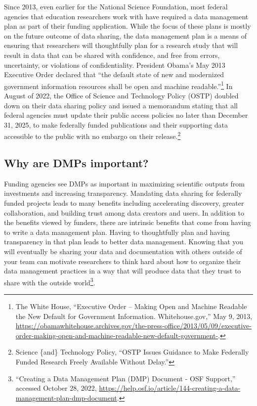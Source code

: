 \documentclass[
]{book}
\begin{document}
Since 2013, even earlier for the National Science Foundation, most federal agencies that education researchers work with have required a data management plan as part of their funding application. While the focus of these plans is mostly on the future outcome of data sharing, the data management plan is a means of ensuring that researchers will thoughtfully plan for a research study that will result in data that can be shared with confidence, and free from errors, uncertainty, or violations of confidentiality. President Obama's May 2013 Executive Order declared that ``the default state of new and modernized government information resources shall be open and machine readable.''\footnote{The White House, {``Executive Order -- Making Open and Machine Readable the New Default for Government Information. Whitehouse.gov,''} May 9, 2013, \url{https://obamawhitehouse.archives.gov/the-press-office/2013/05/09/executive-order-making-open-and-machine-readable-new-default-government-}.} In August of 2022, the Office of Science and Technology Policy (OSTP) doubled down on their data sharing policy and issued a memorandum stating that all federal agencies must update their public access policies no later than December 31, 2025, to make federally funded publications and their supporting data accessible to the public with no embargo on their release.\footnote{Science \{and\} Technology Policy, {``{OSTP} Issues Guidance to Make Federally Funded Research Freely Available Without Delay.''}}

\hypertarget{why-are-dmps-important}{%
\subsection{Why are DMPs important?}\label{why-are-dmps-important}}

Funding agencies see DMPs as important in maximizing scientific outputs from investments and increasing transparency. Mandating data sharing for federally funded projects leads to many benefits including accelerating discovery, greater collaboration, and building trust among data creators and users. In addition to the benefits viewed by funders, there are intrinsic benefits that come from having to write a data management plan. Having to thoughtfully plan and having transparency in that plan leads to better data management. Knowing that you will eventually be sharing your data and documentation with others outside of your team can motivate researchers to think hard about how to organize their data management practices in a way that will produce data that they trust to share with the outside world\footnote{{``Creating a Data Management Plan ({DMP}) Document - {OSF} Support,''} accessed October 28, 2022, \url{https://help.osf.io/article/144-creating-a-data-management-plan-dmp-document}.}.
\end{document}
